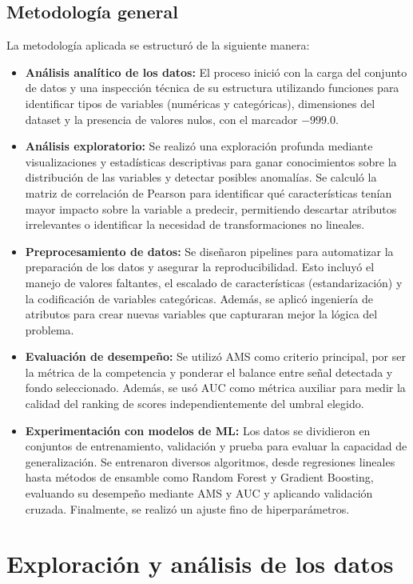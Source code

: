 \documentclass{article}
\begin{document}
\subsection{Metodología general}
La metodología aplicada se estructuró de la siguiente manera:
\begin{itemize}
    \item \textbf{Análisis analítico de los datos:} El proceso inició con la carga del conjunto de datos y una inspección técnica de su estructura utilizando funciones para identificar tipos de variables (numéricas y categóricas), dimensiones del dataset y la presencia de valores nulos, con el marcador $-999.0$. 
    \item \textbf{Análisis exploratorio:} Se realizó una exploración profunda mediante visualizaciones y estadísticas descriptivas para ganar conocimientos sobre la distribución de las variables y detectar posibles anomalías. Se calculó la matriz de correlación de Pearson para identificar qué características tenían mayor impacto sobre la variable a predecir, permitiendo descartar atributos irrelevantes o identificar la necesidad de transformaciones no lineales.
    \item \textbf{Preprocesamiento de datos:} Se diseñaron  pipelines para automatizar la preparación de los datos y asegurar la reproducibilidad. Esto incluyó el manejo de valores faltantes, el escalado de características (estandarización) y la codificación de variables categóricas. Además, se aplicó ingeniería de atributos para crear nuevas variables que capturaran mejor la lógica del problema.
    \item \textbf{Evaluación de desempeño:} Se utilizó AMS como criterio principal, por ser la métrica de la competencia y ponderar el balance entre señal detectada y fondo seleccionado. Además, se usó AUC como métrica auxiliar para medir la calidad del ranking de scores independientemente del umbral elegido.
    \item \textbf{Experimentación con modelos de ML:} Los datos se dividieron en conjuntos de entrenamiento, validación y prueba para evaluar la capacidad de generalización. Se entrenaron diversos algoritmos, desde regresiones lineales hasta métodos de ensamble como Random Forest y Gradient Boosting, evaluando su desempeño mediante AMS y AUC y aplicando validación cruzada. Finalmente, se realizó un ajuste fino de hiperparámetros.    
\end{itemize}

\section{Exploración y análisis de los datos}
\end{document}

